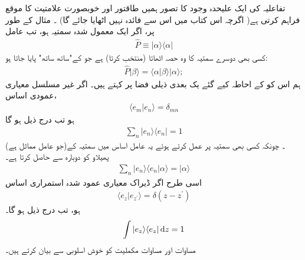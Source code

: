 تفاعلیہ کی ایک علیحدہ وجود کا تصور ہمیں طاقتور اور خوبصورت علامتیت کا موقع فراہم کرتی ہے( اگرچہ اس کتاب میں اس سے فائدہ نہیں اٹھایا جائے گا) ۔ مثال کے طور پر، اگر  ایک معمول شدہ سمتیہ ہو، تب عامل 
\begin{align}
\hat{P} \equiv | \alpha \rangle \langle \alpha | 
\end{align}
کسی بھی دوسرے سمتیہ کا وہ حصہ اٹھاتا (منتخب کرتا) ہے جو  کے"ساتھ ساتھ" پایا جاتا ہو:
\begin{align*}
\hat{P} | \beta \rangle = \langle \alpha | \beta \rangle | \alpha \rangle ;
\end{align*}
ہم اس کو  کے احاطہ کیے گئے یک بعدی ذیلی فضا پر  کہتے ہیں۔ اگر  غیر مسلسل معیاری عمودی اساس،
\begin{align}
\langle e_{m} | e_{n} \rangle = \delta_{mn}
\end{align}
ہو تب درج ذیل ہو گا 
\begin{align}\label{مساوات_قواعد_مکملیت_الف}
\sum_{n} | e_{n} \rangle \langle e_{n} | = 1 
\end{align}
(جو عامل مماثل ہے)۔ چونکہ کسی بھی سمتیہ  پر عمل کرتے ہوئے یہ عامل اساس میں سمتیہ  کے پھیلاو کو دوبارہ سے حاصل کرتا ہے۔ 
\begin{align}
\sum_{n} | e_{n} \rangle \langle e_{n} | \alpha \rangle = | \alpha \rangle 
\end{align}
اسی طرح اگر  ڈیراک معیاری عمود شدہ استمراری اساس 
\begin{align}
\langle e_{z} | e_{z^{'}} \rangle = \delta ( z-z^{'})
\end{align}
ہو، تب درج ذیل ہو گا۔ 
\begin{align}\label{مساوات_قواعد_مکملیت_ب}
\int | e_{z} \rangle \langle e_{z} | \dif z = 1
\end{align}
 مساوات  اور مساوات  مکملیت کو خوش اسلوبی سے بیان کرتے ہیں۔
 
